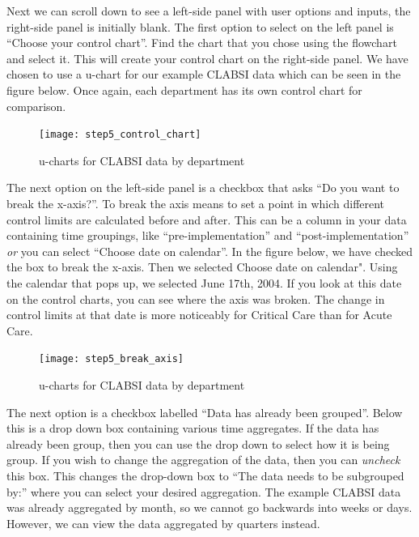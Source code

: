 \documentclass[12pt,openany]{book}
\numberwithin{dummy}{section}
\theoremstyle{ocrenumbox}
\theoremstyle{ocrenumb}
\theoremstyle{blacknumex}
\theoremstyle{blacknumbox}
\theoremstyle{ocrenum}
\begin{document}
Next we can scroll down to see a left-side panel with user options and inputs, the right-side panel is initially blank. The first option to select on the left panel is ``Choose your control chart''. Find the chart that you chose using the flowchart and select it. This will create your control chart on the right-side panel. We have chosen to use a u-chart for our example CLABSI data which can be seen in the figure below. Once again, each department has its own control chart for comparison.

\begin{figure}

{\centering \texttt{[image: step5\_control\_chart]} 

}

\caption{u-charts for CLABSI data by department}\label{fig:unnamed-chunk-3}
\end{figure}

The next option on the left-side panel is a checkbox that asks ``Do you want to break the x-axis?''. To break the axis means to set a point in which different control limits are calculated before and after. This can be a column in your data containing time groupings, like ``pre-implementation'' and ``post-implementation'' \emph{or} you can select ``Choose date on calendar''. In the figure below, we have checked the box to break the x-axis. Then we selected Choose date on calendar". Using the calendar that pops up, we selected June 17th, 2004. If you look at this date on the control charts, you can see where the axis was broken. The change in control limits at that date is more noticeably for Critical Care than for Acute Care.

\begin{figure}

{\centering \texttt{[image: step5\_break\_axis]} 

}

\caption{u-charts for CLABSI data by department}\label{fig:unnamed-chunk-4}
\end{figure}

The next option is a checkbox labelled ``Data has already been grouped''. Below this is a drop down box containing various time aggregates. If the data has already been group, then you can use the drop down to select how it is being group. If you wish to change the aggregation of the data, then you can \emph{uncheck} this box. This changes the drop-down box to ``The data needs to be subgrouped by:'' where you can select your desired aggregation. The example CLABSI data was already aggregated by month, so we cannot go backwards into weeks or days. However, we can view the data aggregated by quarters instead.
\end{document}
